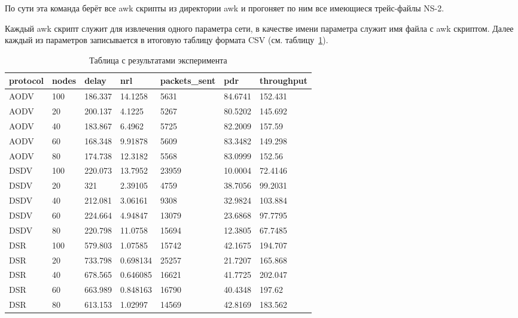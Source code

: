 По сути эта команда берёт все awk скрипты из директории awk и прогоняет по ним все имеющиеся трейс-файлы NS-2.

Каждый awk скрипт служит для извлечения одного параметра сети, в качестве имени параметра служит имя файла с awk скриптом. Далее каждый из параметров записывается в итоговую таблицу формата CSV (см. таблицу~\ref{table:results}).

\begin{table}[!h]
  \begin{tabular}{| l | l | l | l | l | l | l |}
    \hline
    protocol & nodes & delay & nrl & packets\_sent & pdr & throughput \\
    \hline
    AODV & 100 & 186.337 & 14.1258 & 5631 & 84.6741 & 152.431 \\
    \hline
    AODV & 20 & 200.137 & 4.1225 & 5267 & 80.5202 & 145.692 \\
    \hline
    AODV & 40 & 183.867 & 6.4962 & 5725 & 82.2009 & 157.59 \\
    \hline
    AODV & 60 & 168.348 & 9.91878 & 5609 & 83.3482 & 149.298 \\
    \hline
    AODV & 80 & 174.738 & 12.3182 & 5568 & 83.0999 & 152.56 \\
    \hline
    DSDV & 100 & 220.073 & 13.7952 & 23959 & 10.0004 & 72.4146 \\
    \hline
    DSDV & 20 & 321 & 2.39105 & 4759 & 38.7056 & 99.2031 \\
    \hline
    DSDV & 40 & 212.081 & 3.06161 & 9308 & 32.9824 & 103.884 \\
    \hline
    DSDV & 60 & 224.664 & 4.94847 & 13079 & 23.6868 & 97.7795 \\
    \hline
    DSDV & 80 & 220.798 & 11.0758 & 15694 & 12.3805 & 67.7485 \\
    \hline
    DSR & 100 & 579.803 & 1.07585 & 15742 & 42.1675 & 194.707 \\
    \hline
    DSR & 20 & 733.798 & 0.698134 & 25257 & 21.7207 & 165.868 \\
    \hline
    DSR & 40 & 678.565 & 0.646085 & 16621 & 41.7725 & 202.047 \\
    \hline
    DSR & 60 & 663.989 & 0.848163 & 16790 & 40.4348 & 197.62 \\
    \hline
    DSR & 80 & 613.153 & 1.02997 & 14569 & 42.8169 & 183.562 \\
    \hline
  \end{tabular}
  \caption{Таблица с результатами эксперимента}
  \label{table:results}
  \end{table}

